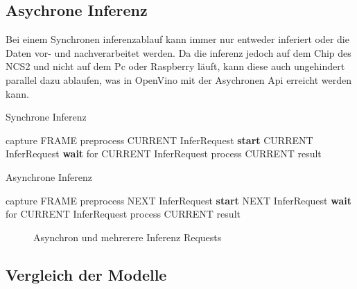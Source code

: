 \subsection{Asychrone Inferenz}

Bei einem Synchronen inferenzablauf kann immer nur entweder inferiert oder 
die Daten vor- und nachverarbeitet werden. Da die inferenz jedoch auf dem 
Chip des NCS2 und nicht auf dem Pc oder Raspberry läuft, kann diese auch 
ungehindert parallel dazu ablaufen, was in OpenVino mit der Asychronen Api 
erreicht werden kann.

\begin{minipage}{0.5\textwidth}
  \centering
  \begin{algorithm}[H]
    \caption{Synchrone Inferenz}
    \begin{algorithmic}
    \WHILE{\TRUE}
        \STATE capture FRAME
        \STATE preprocess CURRENT InferRequest
        \STATE \textbf{start} CURRENT InferRequest
        \STATE \textbf{wait} for CURRENT InferRequest
        \STATE process CURRENT result
    \ENDWHILE
    \end{algorithmic}
  \end{algorithm}
\end{minipage}
\begin{minipage}{0.5\textwidth}
  \centering
  \begin{algorithm}[H]
    \caption{Asynchrone Inferenz}
    \begin{algorithmic}
    \WHILE{\TRUE}
        \STATE capture FRAME
        \STATE preprocess NEXT InferRequest
        \STATE \textbf{start} NEXT InferRequest
          \STATE \textbf{wait} for CURRENT InferRequest
          \STATE process CURRENT result
    \ENDWHILE
    \end{algorithmic}
  \end{algorithm}    
\end{minipage}



\begin{figure}[htb]
    \centering
    \def\svgwidth{0.7\textwidth}
    
    \caption{Asynchron und mehrerere Inferenz Requests}
    \label{fig:async}
\end{figure}




\subsection{Vergleich der Modelle}

